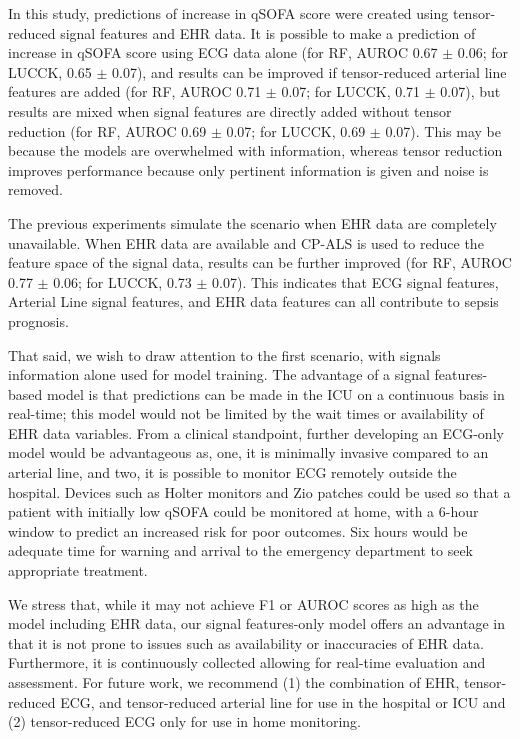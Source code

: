 
In this study, predictions of increase in qSOFA score were created using tensor-reduced signal features and EHR data. It is possible to make a prediction of increase in qSOFA score using ECG data alone (for RF, AUROC 0.67 $\pm$ 0.06; for LUCCK, 0.65 $\pm$ 0.07), and results can be improved if tensor-reduced arterial line features are added (for RF, AUROC 0.71 $\pm$ 0.07; for LUCCK, 0.71 $\pm$ 0.07), but results are mixed when signal features are directly added without tensor reduction (for RF, AUROC 0.69 $\pm$ 0.07; for LUCCK, 0.69 $\pm$ 0.07). This may be because the models are overwhelmed with information, whereas tensor reduction improves performance because only pertinent information is given and noise is removed. 

The previous experiments simulate the scenario when EHR data are completely unavailable. When EHR data are available and CP-ALS is used to reduce the feature space of the signal data, results can be further improved (for RF, AUROC 0.77 $\pm$ 0.06; for LUCCK, 0.73 $\pm$ 0.07). This indicates that ECG signal features, Arterial Line signal features, and EHR data features can all contribute to sepsis prognosis. 

That said, we wish to draw attention to the first scenario, with signals information alone used for model training. The advantage of a signal features-based model is that predictions can be made in the ICU on a continuous basis in real-time; this model would not be limited by the wait times or availability of EHR data variables. From a clinical standpoint, further developing an ECG-only model would be advantageous as, one, it is minimally invasive compared to an arterial line, and two, it is possible to monitor ECG remotely outside the hospital. Devices such as Holter monitors and Zio patches could be used so that a patient with initially low qSOFA could be monitored at home, with a 6-hour window to predict an increased risk for poor outcomes. Six hours would be adequate time for warning and arrival to the emergency department to seek appropriate treatment.

We stress that, while it may not achieve F1 or AUROC scores as high as the model including EHR data, our signal features-only model offers an advantage in that it is not prone to issues such as availability or inaccuracies of EHR data. Furthermore, it is continuously collected allowing for real-time evaluation and assessment. For future work, we recommend (1) the combination of EHR, tensor-reduced ECG, and tensor-reduced arterial line for use in the hospital or ICU and (2) tensor-reduced ECG only for use in home monitoring.